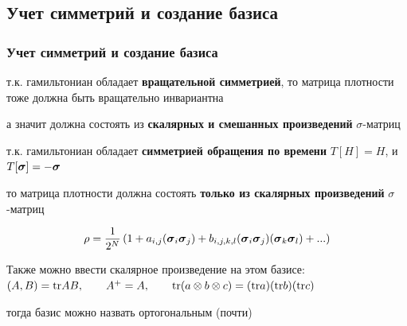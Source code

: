 \documentclass{beamer}
\begin{document}
\subsection{Учет симметрий и создание базиса}
\begin{frame}
\frametitle{Учет симметрий и создание базиса}
т.к. гамильтониан обладает \textbf{ вращательной симметрией}, то матрица плотности тоже должна быть вращательно инвариантна

а значит должна состоять из \textbf{ скалярных и смешанных произведений} $\sigma$-матриц

т.к. гамильтониан обладает \textbf{симметрией обращения по времени} $T[H]=H$, и $T[{\boldsymbol{\sigma}}]=-{\boldsymbol{\sigma}}$

то матрица плотности должна состоять \textbf{только из скалярных произведений} $\sigma$-матриц

$$\rho=\frac{1}{2^N}\left(1+a_{i,j}({\boldsymbol{\sigma}}_i {\boldsymbol{\sigma}}_j)+b_{i,j,k,l}({\boldsymbol{\sigma}}_i {\boldsymbol{\sigma}}_j)({\boldsymbol{\sigma}}_k {\boldsymbol{\sigma}}_l)+...\right)$$

Также можно ввести скалярное произведение на этом базисе: $(A,B)=\mathrm{tr} A B, \qquad A^+=A, \qquad \mathrm{tr}( a\otimes b \otimes c) = (\mathrm{tr} a)(\mathrm{tr} b)(\mathrm{tr} c)$

тогда базис можно назвать ортогональным (почти)
\end{frame}
\end{document}
